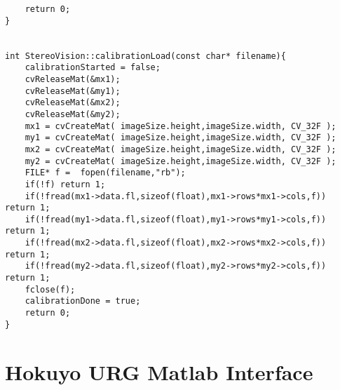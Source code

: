 \begin{lstlisting}
    return 0;
}


int StereoVision::calibrationLoad(const char* filename){
	calibrationStarted = false;
    cvReleaseMat(&mx1);
    cvReleaseMat(&my1);
    cvReleaseMat(&mx2);
    cvReleaseMat(&my2);
    mx1 = cvCreateMat( imageSize.height,imageSize.width, CV_32F );
    my1 = cvCreateMat( imageSize.height,imageSize.width, CV_32F );
    mx2 = cvCreateMat( imageSize.height,imageSize.width, CV_32F );
    my2 = cvCreateMat( imageSize.height,imageSize.width, CV_32F );
    FILE* f =  fopen(filename,"rb");
    if(!f) return 1;
    if(!fread(mx1->data.fl,sizeof(float),mx1->rows*mx1->cols,f)) return 1;
    if(!fread(my1->data.fl,sizeof(float),my1->rows*my1->cols,f)) return 1;
    if(!fread(mx2->data.fl,sizeof(float),mx2->rows*mx2->cols,f)) return 1;
    if(!fread(my2->data.fl,sizeof(float),my2->rows*my2->cols,f)) return 1;
    fclose(f);
    calibrationDone = true;
    return 0;
}

\end{lstlisting}

\section{Hokuyo URG Matlab Interface}
\label{app:urg-mex}


